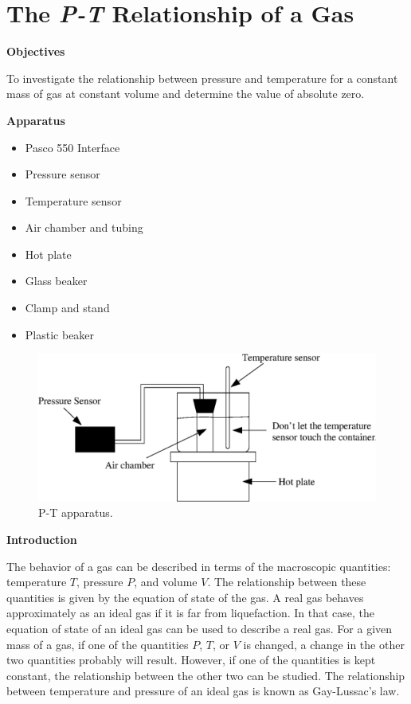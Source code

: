 
\section{The \textit{P-T} Relationship of a Gas}

\makelabheader %

\bigskip
\textbf{Objectives} 

To investigate the relationship between pressure and temperature for
a constant mass of gas at constant volume and determine the value
of absolute zero.

\bigskip

\textbf{Apparatus} 

\begin{itemize}[nosep]
\item Pasco 550 Interface
\item Pressure sensor
\item Temperature sensor
\item Air chamber and tubing
\item Hot plate
\item Glass beaker
\item Clamp and stand
\item Plastic beaker
\end{itemize}
\vspace{0.3cm}

\begin{figure}[hbt]
\begin{center}
\includegraphics[width=6.0in]{P-T_relationship_of_gas/P-T_fig1b.eps}
\caption{P-T apparatus.}
\end{center}
\end{figure}

\textbf{Introduction}

The behavior of a gas can be described in terms of the macroscopic quantities:
temperature $T$, pressure $P$, and volume $V$. The relationship between these
quantities is given by the equation of state of the gas. A real gas behaves
approximately as an ideal gas if it is far from liquefaction. In that case,
the equation of state of an ideal gas can be used to describe a real gas. For
a given mass of a gas, if one of the quantities $P$, $T$, or $V$ is changed, a change
in the other two quantities probably will result. However, if one of the 
quantities is kept constant, the relationship between the other two can be 
studied. The relationship between temperature and pressure of an ideal gas is 
known as Gay-Lussac's law.

